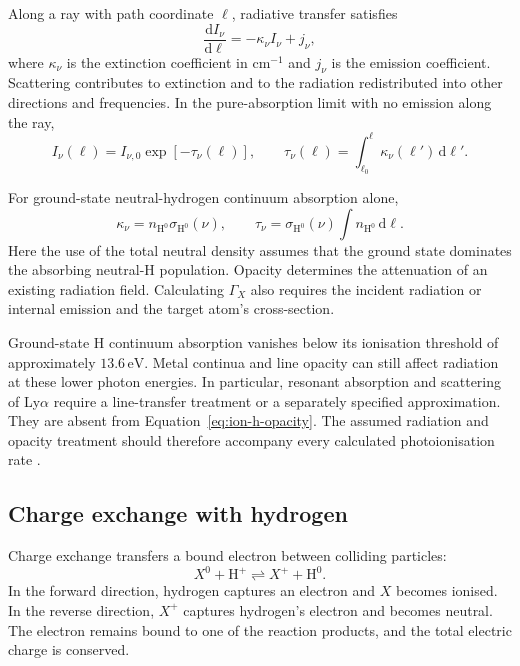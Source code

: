 Along a ray with path coordinate $\ell$, radiative transfer satisfies
\begin{equation}
 \frac{\mathrm{d}I_\nu}{\mathrm{d}\ell}=-\kappa_\nu I_\nu+j_\nu,
 \label{eq:ion-transfer}
\end{equation}
where $\kappa_\nu$ is the extinction coefficient in $\mathrm{cm^{-1}}$ and
$j_\nu$ is the emission coefficient. Scattering contributes to extinction
and to the radiation redistributed into other directions and frequencies.
In the pure-absorption limit with no emission along the ray,
\begin{equation}
 I_\nu(\ell)=I_{\nu,0}\exp[-\tau_\nu(\ell)],
 \qquad
 \tau_\nu(\ell)=\int_{\ell_0}^{\ell}\kappa_\nu(\ell')\,\mathrm{d}\ell'.
 \label{eq:ion-attenuation}
\end{equation}

For ground-state neutral-hydrogen continuum absorption alone,
\begin{equation}
 \kappa_\nu=n_{\mathrm{H^0}}\sigma_{\mathrm{H^0}}(\nu),
 \qquad \tau_\nu=\sigma_{\mathrm{H^0}}(\nu)
          \int n_{\mathrm{H^0}}\,\mathrm{d}\ell.
 \label{eq:ion-h-opacity}
\end{equation}
Here the use of the total neutral density assumes that the ground state
dominates the absorbing neutral-H population.
Opacity determines the attenuation of an existing radiation field.
Calculating $\Gamma_X$ also requires the incident radiation or internal
emission and the target atom's cross-section.

Ground-state H continuum absorption vanishes below its ionisation threshold
of approximately $13.6\,\mathrm{eV}$. Metal continua and line opacity can still
affect radiation at these lower photon energies. In particular, resonant
absorption and scattering of Ly$\alpha$ require a line-transfer treatment
or a separately specified approximation. They are absent from
Equation~\eqref{eq:ion-h-opacity}. The assumed radiation and opacity treatment
should therefore accompany every calculated photoionisation rate
\citep{Laming2015,Dufresne2025}.

\subsection{Charge exchange with hydrogen}

Charge exchange transfers a bound electron between colliding particles:
\begin{equation}
 X^0+\mathrm{H^+}\rightleftharpoons X^++\mathrm{H^0}.
 \label{eq:ion-cx}
\end{equation}
In the forward direction, hydrogen captures an electron and $X$ becomes
ionised. In the reverse direction, $X^+$ captures hydrogen's electron and
becomes neutral. The electron remains bound to one of the reaction products,
and the total electric charge is conserved.

